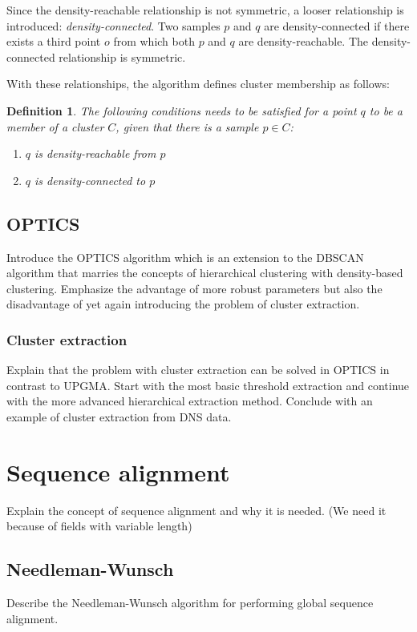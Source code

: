 \documentclass[a4paper]{report}
\newtheorem*{definition}{Definition}
\begin{document}
Since the density-reachable relationship is not symmetric, a looser
relationship is introduced: \textit{density-connected}. Two samples $p$ and
$q$ are density-connected if there exists a third point $o$ from which both
$p$ and $q$ are density-reachable. The density-connected relationship
is symmetric.

With these relationships, the algorithm defines cluster membership as
follows:

\begin{definition}
    The following conditions needs to be satisfied for a point $q$ to be a 
    member of a cluster $C$, given that there is a sample $p \in C$:
    \begin{enumerate}
        \item $q$ is density-reachable from $p$
        \item $q$ is density-connected to $p$
    \end{enumerate}
\end{definition}

\subsection{OPTICS}
Introduce the OPTICS algorithm which is an extension to the DBSCAN algorithm
that marries the concepts of hierarchical clustering with density-based
clustering. Emphasize the advantage of more robust parameters but also the
disadvantage of yet again introducing the problem of cluster extraction.

\subsubsection{Cluster extraction}
Explain that the problem with cluster extraction can be solved in OPTICS in
contrast to UPGMA. Start with the most basic threshold extraction and continue
with the more advanced hierarchical extraction method. Conclude with an example
of cluster extraction from DNS data.

\section{Sequence alignment}
Explain the concept of sequence alignment and why it is needed. (We need it
because of fields with variable length)

\subsection{Needleman-Wunsch}
Describe the Needleman-Wunsch algorithm for performing global sequence
alignment.
\end{document}
